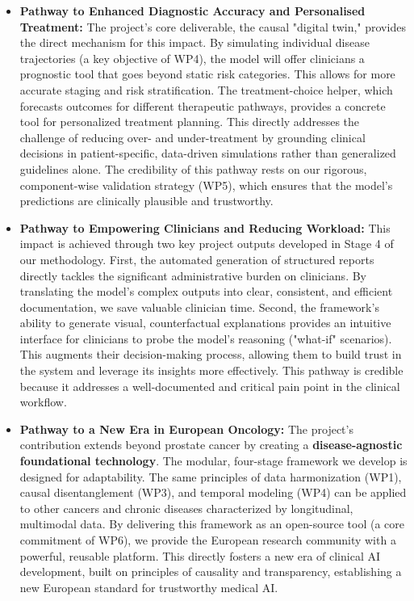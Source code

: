 \documentclass[11pt, a4paper]{article}
\begin{document}
\begin{itemize}
    \item \textbf{Pathway to Enhanced Diagnostic Accuracy and Personalised Treatment:} The project's core deliverable, the causal "digital twin," provides the direct mechanism for this impact. By simulating individual disease trajectories (a key objective of WP4), the model will offer clinicians a prognostic tool that goes beyond static risk categories. This allows for more accurate staging and risk stratification. The treatment-choice helper, which forecasts outcomes for different therapeutic pathways, provides a concrete tool for personalized treatment planning. This directly addresses the challenge of reducing over- and under-treatment by grounding clinical decisions in patient-specific, data-driven simulations rather than generalized guidelines alone. The credibility of this pathway rests on our rigorous, component-wise validation strategy (WP5), which ensures that the model's predictions are clinically plausible and trustworthy.

    \item \textbf{Pathway to Empowering Clinicians and Reducing Workload:} This impact is achieved through two key project outputs developed in Stage 4 of our methodology. First, the automated generation of structured reports directly tackles the significant administrative burden on clinicians. By translating the model's complex outputs into clear, consistent, and efficient documentation, we save valuable clinician time. Second, the framework's ability to generate visual, counterfactual explanations provides an intuitive interface for clinicians to probe the model's reasoning ("what-if" scenarios). This augments their decision-making process, allowing them to build trust in the system and leverage its insights more effectively. This pathway is credible because it addresses a well-documented and critical pain point in the clinical workflow.

    \item \textbf{Pathway to a New Era in European Oncology:} The project's contribution extends beyond prostate cancer by creating a \textbf{disease-agnostic foundational technology}. The modular, four-stage framework we develop is designed for adaptability. The same principles of data harmonization (WP1), causal disentanglement (WP3), and temporal modeling (WP4) can be applied to other cancers and chronic diseases characterized by longitudinal, multimodal data. By delivering this framework as an open-source tool (a core commitment of WP6), we provide the European research community with a powerful, reusable platform. This directly fosters a new era of clinical AI development, built on principles of causality and transparency, establishing a new European standard for trustworthy medical AI.
\end{itemize}
\end{document}
